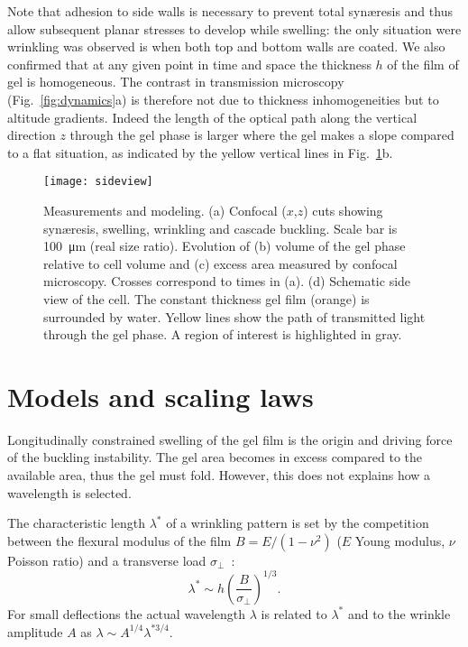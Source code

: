 \documentclass[twocolumn,superscriptaddress,showpacs,preprintnumbers,
amsmath,amssymb,prl]{revtex4-1}
\begin{document}
Note that adhesion to side walls is necessary to prevent total syn\ae{}resis and thus allow subsequent planar stresses to develop while swelling: the only situation were wrinkling was observed is when both top and bottom walls are coated. We also confirmed that at any given point in time and space the thickness $h$ of the film of gel is homogeneous. The contrast in transmission microscopy (Fig.~\ref{fig:dynamics}a) is therefore not due to thickness inhomogeneities but to altitude gradients. Indeed the length of the optical path along the vertical direction $z$ through the gel phase is larger where the gel makes a slope compared to a flat situation, as indicated by the yellow vertical lines in Fig.~\ref{fig:sideview}b.

\begin{figure}
	\texttt{[image: sideview]}
	\caption{Measurements and modeling. (a) Confocal ($x$,$z$) cuts showing syn\ae{}resis, swelling, wrinkling and cascade buckling. Scale bar is \SI{100}{\micro\metre} (real size ratio). Evolution of (b) volume of the gel phase relative to cell volume and (c) excess area measured by confocal microscopy. Crosses correspond to times in (a). (d) Schematic side view of the cell. The constant thickness gel film (orange) is surrounded by water. Yellow lines show the path of transmitted light through the gel phase. A region of interest is highlighted in gray.}
	\label{fig:sideview}
\end{figure}

\section*{Models and scaling laws}

Longitudinally constrained swelling of the gel film is the origin and driving force of the buckling instability. The gel area becomes in excess compared to the available area, thus the gel must fold. However, this does not explains how a wavelength is selected.

The characteristic length $\lambda^*$ of a wrinkling pattern is set by the competition between the flexural modulus of the film $B=E/(1-\nu^2)$ ($E$ Young modulus, $\nu$ Poisson ratio) and a transverse load $\sigma_\perp$~\cite{Vella2009,Kolinski2009}: 
\begin{equation}
\lambda^* \sim h \left(\frac{B}{\sigma_\perp}\right)^{1/3}.
\label{eq:lstar}
\end{equation}
For small deflections the actual wavelength $\lambda$ is related to $\lambda^*$ and to the wrinkle amplitude $A$ as $\lambda \sim A^{1/4} \lambda^{*3/4}$.
\end{document}

